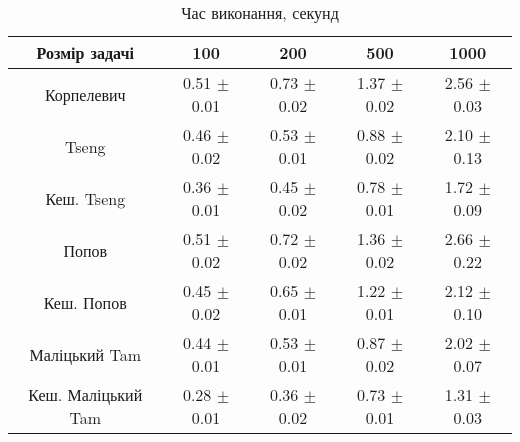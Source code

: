 \begin{table}[H]
	\centering
	\begin{tabular}{|c||c|c|c|c|}\hline
		Розмір задачі & 100 & 200 & 500 & 1000 \\ \hline \hline
		Корпелевич & 0.51 $\pm$ 0.01 & 0.73 $\pm$ 0.02 & 1.37 $\pm$ 0.02 & 2.56 $\pm$ 0.03 \\ \hline
		Tseng & 0.46 $\pm$ 0.02 & 0.53 $\pm$ 0.01 & 0.88 $\pm$ 0.02 & 2.10 $\pm$ 0.13 \\ \hline
		Кеш. Tseng & 0.36 $\pm$ 0.01 & 0.45 $\pm$ 0.02 & 0.78 $\pm$ 0.01 & 1.72 $\pm$ 0.09 \\ \hline
		Попов & 0.51 $\pm$ 0.02 & 0.72 $\pm$ 0.02 & 1.36 $\pm$ 0.02 & 2.66 $\pm$ 0.22 \\ \hline
		Кеш. Попов & 0.45 $\pm$ 0.02 & 0.65 $\pm$ 0.01 & 1.22 $\pm$ 0.01 & 2.12 $\pm$ 0.10 \\ \hline
		Маліцький Tam & 0.44 $\pm$ 0.01 & 0.53 $\pm$ 0.01 & 0.87 $\pm$ 0.02 & 2.02 $\pm$ 0.07 \\ \hline
		Кеш. Маліцький Tam & 0.28 $\pm$ 0.01 & 0.36 $\pm$ 0.02 & 0.73 $\pm$ 0.01 & 1.31 $\pm$ 0.03 \\ \hline
	\end{tabular}
	\caption{Час виконання, секунд}
\end{table}
